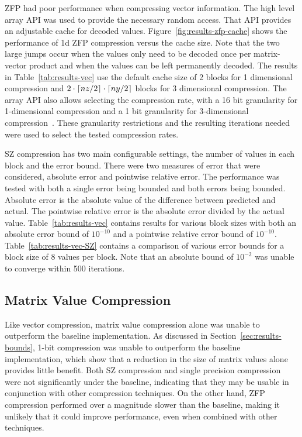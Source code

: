 ZFP had poor performance when compressing vector information.
The high level array API was used to provide the necessary random access.
That API provides an adjustable cache for decoded values.
Figure~\ref{fig:results-zfp-cache} shows the performance of 1d ZFP compression versus the cache size.
Note that the two large jumps occur when the values only need to be decoded once per matrix-vector product and when the values can be left permanently decoded.
The results in Table~\ref{tab:results-vec} use the default cache size of 2 blocks for 1 dimensional compression and \({2\cdot\lceil nz/2\rceil\cdot\lceil ny/2\rceil}\) blocks for 3 dimensional compression.
The array API also allows selecting the compression rate, with a 16 bit granularity for 1-dimensional compression and a 1 bit granularity for 3-dimensional compression~\cite{Lindstrom:2014:zfp}.
These granularity restrictions and the resulting iterations needed were used to select the tested compression rates.



SZ compression has two main configurable settings, the number of values in each block and the error bound.
There were two measures of error that were considered, absolute error and pointwise relative error.
The performance was tested with both a single error being bounded and both errors being bounded.
Absolute error is the absolute value of the difference between predicted and actual.
The pointwise relative error is the absolute error divided by the actual value.
Table~\ref{tab:results-vec} contains results for various block sizes with both an absolute error bound of \(10^{-10}\) and a pointwise relative error bound of \(10^{-10}\).
Table~\ref{tab:results-vec-SZ} contains a comparison of various error bounds for a block size of 8 values per block.
Note that an absolute bound of \(10^{-2}\) was unable to converge within 500 iterations.



\subsection{Matrix Value Compression}
Like vector compression, matrix value compression alone was unable to outperform the baseline implementation.
As discussed in Section~\ref{sec:results-bounds}, 1-bit compression was unable to outperform the baseline implementation, which show that a reduction in the size of matrix values alone provides little benefit.
Both SZ compression and single precision compression were not significantly under the baseline, indicating that they may be usable in conjunction with other compression techniques.
On the other hand, ZFP compression performed over a magnitude slower than the baseline, making it unlikely that it could improve performance, even when combined with other techniques.

